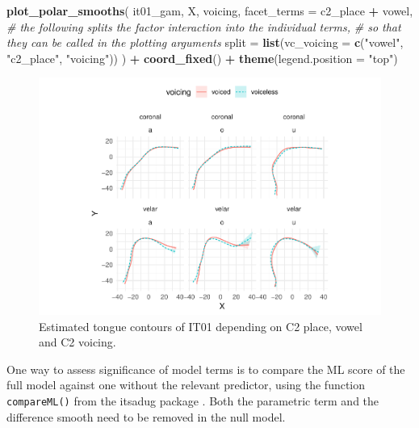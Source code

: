 \documentclass[11pt,]{article}
\newenvironment{Shaded}{\begin{snugshade}}{\end{snugshade}}
\newcommand{\CommentTok}[1]{\textcolor[rgb]{0.56,0.35,0.01}{\textit{#1}}}
\newcommand{\DataTypeTok}[1]{\textcolor[rgb]{0.13,0.29,0.53}{#1}}
\newcommand{\KeywordTok}[1]{\textcolor[rgb]{0.13,0.29,0.53}{\textbf{#1}}}
\newcommand{\NormalTok}[1]{#1}
\newcommand{\OperatorTok}[1]{\textcolor[rgb]{0.81,0.36,0.00}{\textbf{#1}}}
\newcommand{\StringTok}[1]{\textcolor[rgb]{0.31,0.60,0.02}{#1}}
\begin{document}
\begin{Shaded}
\begin{Highlighting}[]
\KeywordTok{plot_polar_smooths}\NormalTok{(}
\NormalTok{  it01_gam,}
\NormalTok{  X,}
\NormalTok{  voicing,}
  \DataTypeTok{facet_terms =}\NormalTok{ c2_place }\OperatorTok{+}\StringTok{ }\NormalTok{vowel,}
  \CommentTok{# the following splits the factor interaction into the individual terms,}
  \CommentTok{# so that they can be called in the plotting arguments}
  \DataTypeTok{split =} \KeywordTok{list}\NormalTok{(}\DataTypeTok{vc_voicing =} \KeywordTok{c}\NormalTok{(}\StringTok{"vowel"}\NormalTok{, }\StringTok{"c2_place"}\NormalTok{, }\StringTok{"voicing"}\NormalTok{))}
\NormalTok{) }\OperatorTok{+}
\StringTok{  }\KeywordTok{coord_fixed}\NormalTok{() }\OperatorTok{+}
\StringTok{  }\KeywordTok{theme}\NormalTok{(}\DataTypeTok{legend.position =} \StringTok{"top"}\NormalTok{)}
\end{Highlighting}
\end{Shaded}

\begin{figure}

{\centering \includegraphics[width=\linewidth]{2018-polar-gam_files/figure-latex/Figure03} 

}

\caption{Estimated tongue contours of IT01 depending on C2 place, vowel and C2 voicing.}\label{f:Figure03}
\end{figure}

One way to assess significance of model terms is to compare the ML score
of the full model against one without the relevant predictor, using the
function \texttt{compareML()} from the itsadug package
\citep{van-rij2017}. Both the parametric term and the difference smooth
need to be removed in the null model.
\end{document}
